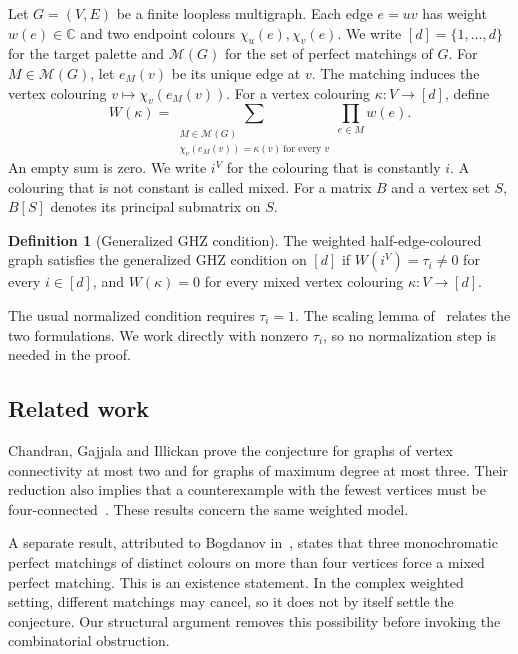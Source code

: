 \documentclass[11pt]{article}
\theoremstyle{definition}
\newtheorem{definition}[theorem]{Definition}
\theoremstyle{plain}
\numberwithin{equation}{section}
\begin{document}
Let \(G=(V,E)\) be a finite loopless multigraph. Each edge \(e=uv\) has
weight \(w(e)\in\mathbb C\) and two endpoint colours \(\chi_u(e),\chi_v(e)\).
We write \([d]=\{1,\ldots,d\}\) for the target palette and
\(\mathcal M(G)\) for the set of perfect matchings of \(G\).
For \(M\in\mathcal M(G)\), let \(e_M(v)\) be its unique edge at \(v\).
The matching induces the vertex colouring
\(v\mapsto\chi_v(e_M(v))\). For a vertex colouring \(\kappa:V\to[d]\), define
\[
 W(\kappa)=
 \sum_{\substack{M\in\mathcal M(G)\\
       \chi_v(e_M(v))=\kappa(v)\ \text{for every }v}}
       \prod_{e\in M}w(e).
\]
An empty sum is zero. We write \(i^V\) for the colouring that is constantly
\(i\). A colouring that is not constant is called mixed. For a matrix \(B\)
and a vertex set \(S\), \(B[S]\) denotes its principal submatrix on \(S\).

\begin{definition}[Generalized GHZ condition]\label{def:ghz}
The weighted half-edge-coloured graph satisfies the generalized GHZ condition
on \([d]\) if \(W(i^V)=\tau_i\ne0\) for every \(i\in[d]\), and
\(W(\kappa)=0\) for every mixed vertex colouring \(\kappa:V\to[d]\).
\end{definition}

The usual normalized condition requires \(\tau_i=1\). The scaling lemma
of~\cite[Lemma~14]{cgi} relates the two formulations. We work directly with
nonzero \(\tau_i\), so no normalization step is needed in the proof.

\subsection{Related work}

Chandran, Gajjala and Illickan prove the conjecture for graphs of vertex
connectivity at most two and for graphs of maximum degree at most three.
Their reduction also implies that a counterexample with the fewest vertices
must be four-connected~\cite[Theorems~9--11]{cgi}. These results concern the
same weighted model.

A separate result, attributed to Bogdanov in~\cite[Theorem~7]{cgi}, states
that three monochromatic perfect matchings of distinct colours on more than
four vertices force a mixed perfect matching. This is an existence statement.
In the complex weighted setting, different matchings may cancel, so it does
not by itself settle the conjecture. Our structural argument removes this
possibility before invoking the combinatorial obstruction.
\end{document}
